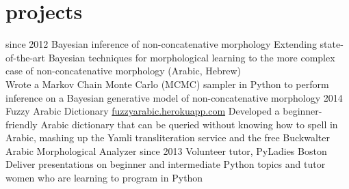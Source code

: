 \documentclass[]{friggeri-cv}
\begin{document}
\section{projects}

\begin{entrylist}
  \entry
    {since 2012}
    {Bayesian inference of non-concatenative morphology}
    {}
    {Extending state-of-the-art Bayesian techniques for morphological learning to the more complex case of non-concatenative morphology (Arabic, Hebrew) \\
    Wrote a Markov Chain Monte Carlo (MCMC) sampler in Python to perform inference on a Bayesian generative model of non-concatenative morphology}
  \entry
    {2014}
    {Fuzzy Arabic Dictionary}
    {\href{http://fuzzyarabic.herokuapp.com}{fuzzyarabic.herokuapp.com}}
    {Developed a beginner-friendly Arabic dictionary that can be queried without knowing how to spell in Arabic, mashing up the Yamli transliteration service and the free Buckwalter Arabic Morphological Analyzer}
  \entry
    {since 2013}
    {Volunteer tutor, PyLadies Boston}
    {}
    {Deliver presentations on beginner and intermediate Python topics and tutor women who are learning to program in Python}
\end{entrylist}
\end{document}
